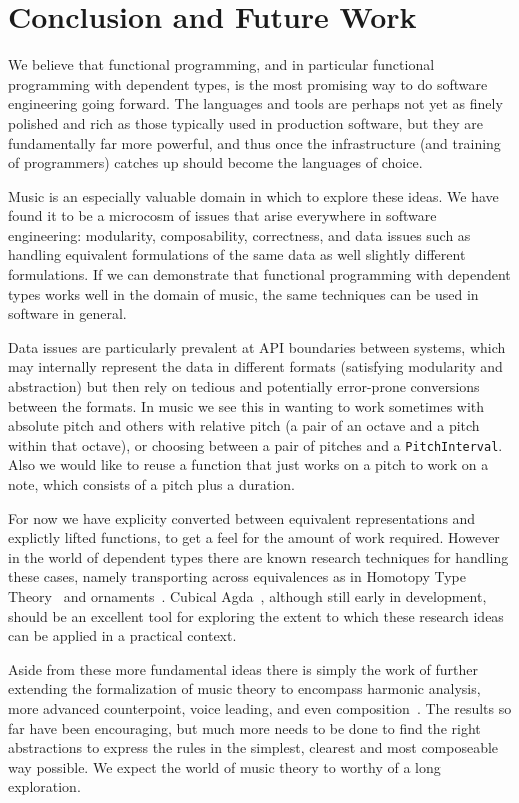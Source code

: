 \section{Conclusion and Future Work}
\label{sec:conclusion}

We believe that functional programming, and in particular functional
programming with dependent types, is the most promising way to do software
engineering going forward. The languages and tools are perhaps not yet
as finely polished and rich as those typically used in production
software, but they are fundamentally far more powerful, and thus once
the infrastructure (and training of programmers) catches up should
become the languages of choice.

Music is an especially valuable domain in which to explore these
ideas. We have found it to be a microcosm of issues that arise
everywhere in software engineering: modularity, composability,
correctness, and data issues such as handling equivalent formulations of
the same data as well slightly different formulations. If we can
demonstrate that functional programming with dependent types works
well in the domain of music, the same techniques can be used in
software in general.

Data issues are particularly prevalent at API boundaries between
systems, which may internally represent the data in different formats
(satisfying modularity and abstraction) but then rely on tedious and
potentially error-prone conversions between the formats. In music
we see this in wanting to work sometimes with absolute pitch and others
with relative pitch (a pair of an octave and a pitch within that
octave), or choosing between
a pair of pitches and a \texttt{PitchInterval}. Also we would like to
reuse a function that just works on a pitch to work on a note, which
consists of a pitch plus a duration.

For now we have explicity converted between equivalent representations
and explictly lifted functions, to get a feel for the amount of work
required.  However in the world of dependent types there are known
research techniques for handling these cases, namely transporting
across equivalences as in Homotopy Type Theory~\citep{hottbook} and
ornaments~\citep{dagand-ornaments}. Cubical
Agda~\citep{vezzosi-cubical}, although still early in development,
should be an excellent tool for exploring the extent to which these
research ideas can be applied in a practical context.

Aside from these more fundamental ideas there is simply the work of
further extending the formalization of music theory to encompass
harmonic analysis, more advanced counterpoint, voice leading, and even
composition~\citep{schoenberg-fundamentals}. The results so far have
been encouraging, but much more needs to be done to find the right
abstractions to express the rules in the simplest, clearest and most
composeable way possible.
We expect the world of music theory to worthy of a long exploration.

